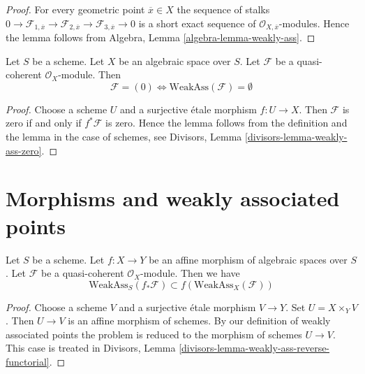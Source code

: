 \begin{proof}
For every geometric point $\overline{x} \in X$
the sequence of stalks
$0 \to \mathcal{F}_{1, \overline{x}} \to
\mathcal{F}_{2, \overline{x}} \to
\mathcal{F}_{3, \overline{x}} \to 0$
is a short exact sequence of $\mathcal{O}_{X, \overline{x}}$-modules.
Hence the lemma follows from
Algebra, Lemma \ref{algebra-lemma-weakly-ass}.
\end{proof}

\begin{lemma}
\label{lemma-weakly-ass-zero}
Let $S$ be a scheme. Let $X$ be an algebraic space over $S$.
Let $\mathcal{F}$ be a quasi-coherent $\mathcal{O}_X$-module.
Then
$$
\mathcal{F} = (0) \Leftrightarrow \text{WeakAss}(\mathcal{F}) = \emptyset
$$
\end{lemma}

\begin{proof}
Choose a scheme $U$ and a surjective \'etale morphism $f : U \to X$.
Then $\mathcal{F}$ is zero if and only if $f^*\mathcal{F}$ is zero.
Hence the lemma follows from the definition and the lemma in the
case of schemes, see
Divisors, Lemma \ref{divisors-lemma-weakly-ass-zero}.
\end{proof}











\section{Morphisms and weakly associated points}
\label{section-morphisms-weakly-associated}

\begin{lemma}
\label{lemma-weakly-ass-reverse-functorial}
Let $S$ be a scheme.
Let $f : X \to Y$ be an affine morphism of algebraic spaces over $S$.
Let $\mathcal{F}$ be a quasi-coherent $\mathcal{O}_X$-module.
Then we have
$$
\text{WeakAss}_S(f_*\mathcal{F}) \subset f(\text{WeakAss}_X(\mathcal{F}))
$$
\end{lemma}

\begin{proof}
Choose a scheme $V$ and a surjective \'etale morphism $V \to Y$.
Set $U = X \times_Y V$. Then $U \to V$ is an affine morphism
of schemes. By our definition of weakly associated points
the problem is reduced to the morphism of schemes $U \to V$. This case is
treated in Divisors, Lemma \ref{divisors-lemma-weakly-ass-reverse-functorial}.
\end{proof}













